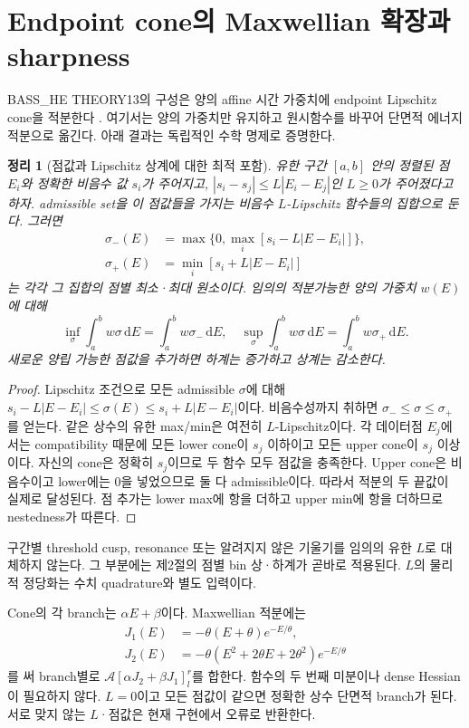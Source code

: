 \documentclass[11pt,a4paper]{article}
\newcommand{\dd}{\mathrm d}\newcommand{\eV}{\mathrm{eV}}\newcommand{\kb}{k_{\rm B}}\newcommand{\ev}{\epsilon_{\eV}}
\newtheorem{theorem}{정리}[section]
\begin{document}
\newpage
\section{Endpoint cone의 Maxwellian 확장과 sharpness}
BASS\_HE THEORY13의 구성은 양의 affine 시간 가중치에 endpoint Lipschitz cone을 적분한다 \cite{he13}. 여기서는 양의 가중치만 유지하고 원시함수를 바꾸어 단면적 에너지 적분으로 옮긴다. 아래 결과는 독립적인 수학 명제로 증명한다.

\begin{theorem}[점값과 Lipschitz 상계에 대한 최적 포함]\label{thm:cone}
유한 구간 $[a,b]$ 안의 정렬된 점 $E_i$와 정확한 비음수 값 $s_i$가 주어지고,
$|s_i-s_j|\le L|E_i-E_j|$인 $L\ge0$가 주어졌다고 하자. admissible set을 이 점값들을 가지는 비음수 $L$-Lipschitz 함수들의 집합으로 둔다. 그러면
\begin{align}
\sigma_-(E)&=\max\{0,\max_i[s_i-L|E-E_i|]\},\\
\sigma_+(E)&=\min_i[s_i+L|E-E_i|]
\end{align}
는 각각 그 집합의 점별 최소·최대 원소이다. 임의의 적분가능한 양의 가중치 $w(E)$에 대해
\begin{equation}
\inf_{\sigma}\int_a^bw\sigma\,\dd E=\int_a^bw\sigma_-\,\dd E,
\quad
\sup_{\sigma}\int_a^bw\sigma\,\dd E=\int_a^bw\sigma_+\,\dd E.
\end{equation}
새로운 양립 가능한 점값을 추가하면 하계는 증가하고 상계는 감소한다.
\end{theorem}
\begin{proof}
Lipschitz 조건으로 모든 admissible $\sigma$에 대해 $s_i-L|E-E_i|\le\sigma(E)\le s_i+L|E-E_i|$이다. 비음수성까지 취하면 $\sigma_-\le\sigma\le\sigma_+$를 얻는다. 같은 상수의 유한 max/min은 여전히 $L$-Lipschitz이다. 각 데이터점 $E_j$에서는 compatibility 때문에 모든 lower cone이 $s_j$ 이하이고 모든 upper cone이 $s_j$ 이상이다. 자신의 cone은 정확히 $s_j$이므로 두 함수 모두 점값을 충족한다. Upper cone은 비음수이고 lower에는 0을 넣었으므로 둘 다 admissible이다. 따라서 적분의 두 끝값이 실제로 달성된다. 점 추가는 lower max에 항을 더하고 upper min에 항을 더하므로 nestedness가 따른다.
\end{proof}
구간별 threshold cusp, resonance 또는 알려지지 않은 기울기를 임의의 유한 $L$로 대체하지 않는다. 그 부분에는 제2절의 점별 bin 상·하계가 곧바로 적용된다. $L$의 물리적 정당화는 수치 quadrature와 별도 입력이다.

Cone의 각 branch는 $\alpha E+\beta$이다. Maxwellian 적분에는
\begin{align}
J_1(E)&=-\theta(E+\theta)e^{-E/\theta},\\
J_2(E)&=-\theta(E^2+2\theta E+2\theta^2)e^{-E/\theta}
\end{align}
를 써 branch별로 $\mathcal A[\alpha J_2+\beta J_1]_{l}^{r}$를 합한다. 함수의 두 번째 미분이나 dense Hessian이 필요하지 않다. $L=0$이고 모든 점값이 같으면 정확한 상수 단면적 branch가 된다. 서로 맞지 않는 $L$·점값은 현재 구현에서 오류로 반환한다.
\end{document}
